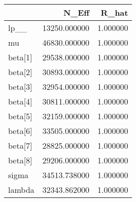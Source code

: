 \begin{tabular}{lrr}
\toprule
 & N\_Eff & R\_hat \\
\midrule
lp\_\_ & 13250.000000 & 1.000000 \\
mu & 46830.000000 & 1.000000 \\
beta[1] & 29538.000000 & 1.000000 \\
beta[2] & 30893.000000 & 1.000000 \\
beta[3] & 32954.000000 & 1.000000 \\
beta[4] & 30811.000000 & 1.000000 \\
beta[5] & 32159.000000 & 1.000000 \\
beta[6] & 33505.000000 & 1.000000 \\
beta[7] & 28825.000000 & 1.000000 \\
beta[8] & 29206.000000 & 1.000000 \\
sigma & 34513.738000 & 1.000000 \\
lambda & 32343.862000 & 1.000000 \\
\bottomrule
\end{tabular}

